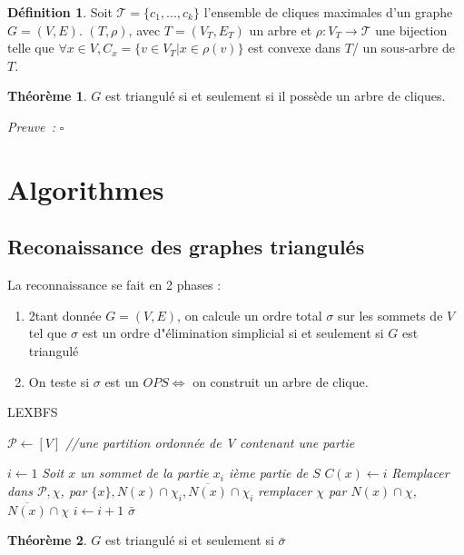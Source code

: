 \documentclass{book}
\theoremstyle{definition}
\newtheorem{theorem}{Théorème}
\newtheorem{definition}{Définition}
\numberwithin{lemma}{subsection}
\numberwithin{theorem}{subsection}
\numberwithin{definition}{subsection}
\numberwithin{proposition}{subsection}
\numberwithin{corollary}{subsection}
\numberwithin{property}{subsection}
\numberwithin{example}{subsection}
\numberwithin{heuristique}{subsection}
\numberwithin{scenario}{subsection}
\newenvironment{proofi} {\noindent\emph{Preuve~:}} {\hfill $\square$\vspace{0.2cm}}
\begin{document}
\begin{definition}
Soit $\mathcal{T} = \{ c_1, ..., c_k \}$ l'ensemble de cliques maximales d'un graphe $G = (V, E)$. $(T, \rho)$, avec $T = (V_T, E_T)$ un arbre et $\rho : V_T \to \mathcal{T}$ une bijection telle que $\forall x \in V, C_x = \{v \in V_T | x \in \rho(v)  \}$ est convexe dans $T$/ un sous-arbre de $T$.
\end{definition}

\begin{theorem}
 $G$ est triangulé si et seulement si il possède un arbre de cliques.
\end{theorem}

\begin{proofi}
\end{proofi}

\section{Algorithmes}

\subsection{Reconaissance des graphes triangulés}

La reconnaissance se fait en 2 phases :
\begin{enumerate}
    \item 2tant donnée $G = (V, E)$, on calcule un ordre total $\sigma$ sur les sommets de $V$ tel que $\sigma$ est un ordre d"élimination simplicial si et seulement si $G$ est triangulé
    \item On teste si $\sigma$ est un $OPS \iff$ on construit un arbre de clique. 
\end{enumerate}

\begin{algorithm}[H]\label{algo:LEXBFS}
\caption{LEXBFS} 
\SetAlgoLined
\DontPrintSemicolon
\SetAlgoLined
\DontPrintSemicolon
{}
    
    $\mathcal{P} \gets [V]$\; \textit{//une partition ordonnée de V contenant une partie}
    
    $i \gets 1$\;
    {
        \textit{Soit $x$ un sommet de la partie $x_i$ ième partie de $S$}\;
        $C(x) \gets i$\;
        \textit{Remplacer dans $\mathcal{P}, \chi$, par $\{ x \}, N(x) \cap \chi_i, \overline{N(x)} \cap \chi_i$}\;
        {
            {
                \textit{remplacer $\chi$ par $N(x) \cap \chi$, $\overline{N(x)} \cap \chi$}\;
            }
            $i \gets i + 1$\;
        }
    }
    \Return $\bar{\sigma}$
\end{algorithm}

\begin{theorem}
 $G$ est triangulé si et seulement si $\bar{\sigma}$
\end{theorem}
\end{document}

